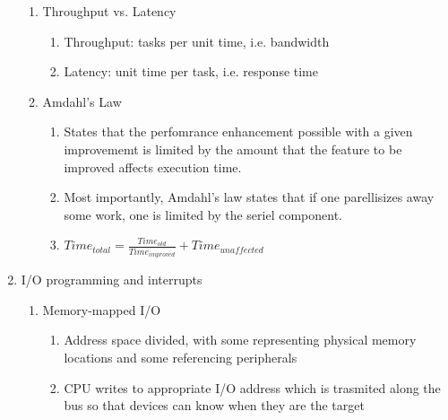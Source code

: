 \documentclass[12pt]{article}
\renewcommand{\=}[1]{\stackrel{#1}{=}} %
\theoremstyle{definition}
\theoremstyle{remark}
\begin{document}
\begin{enumerate}
\begin{enumerate}
    \item Throughput vs. Latency
      \begin{enumerate}
      \item Throughput: tasks per unit time, i.e. bandwidth
      \item Latency: unit time per task, i.e. response time
      \end{enumerate}

    \item Amdahl's Law
      \begin{enumerate}
      \item States that the perfomrance enhancement possible with a given improvememt is limited by the amount that the feature to be improved affects execution time.
      \item Most importantly, Amdahl's law states that if one
        parellisizes away some work, one is limited by the seriel component.
      \item $Time_{total} = \frac{Time_{old}} { Time_{improved}} + Time_{unaffected}$
      \end{enumerate}

    \end{enumerate}
  \item I/O programming and interrupts
    \begin{enumerate}
    \item Memory-mapped I/O
      \begin{enumerate}
      \item Address space divided, with some representing physical memory locations and some referencing peripherals
      \item CPU writes to appropriate I/O address which is trasmited along the bus so that devices can know when they are the target
      \end{enumerate}


\end{enumerate}
\end{enumerate}
\end{document}
